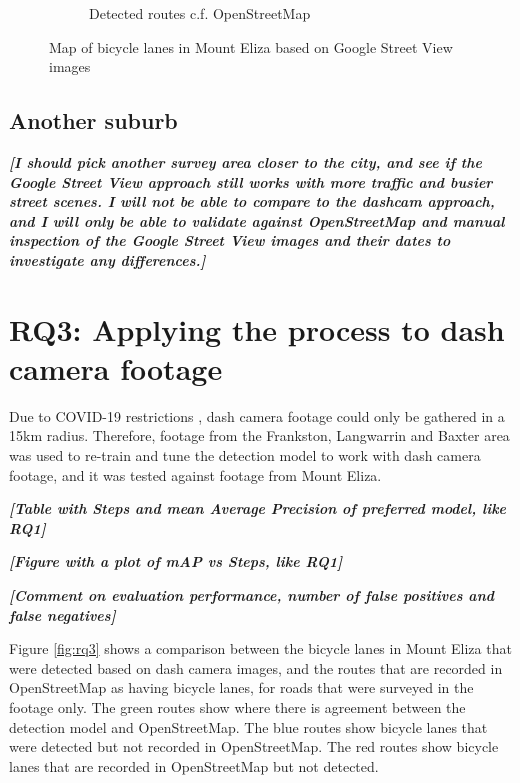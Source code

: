 \documentclass[11pt,twoside]{report}
\newcommand{\remark}[1]{{\bf \em [\marginpar{$\Leftarrow$}#1]}}
\begin{document}
\begin{figure}[h]
\begin{subfigure}{0.45\textwidth}
	\caption{Detected routes c.f. OpenStreetMap}
	\label{fig:rq2b}
\end{subfigure}
\caption{Map of bicycle lanes in Mount Eliza based on Google Street View images}
\label{fig:rq2}
\end{figure}


\subsection{Another suburb}

\remark{I should pick another survey area closer to the city, and see if the Google Street View approach still works with more traffic and busier street scenes.  I will not be able to compare to the dashcam approach, and I will only be able to validate against OpenStreetMap and manual inspection of the Google Street View images and their dates to investigate any differences.}


\clearpage
\section{RQ3: Applying the process to dash camera footage}
\label{results:rq3}

Due to COVID-19 restrictions \cite{lockdown_5km} \cite{lockdown_record}, dash camera footage could only be gathered in a 15km radius.  Therefore, footage from the Frankston, Langwarrin and Baxter area was used to re-train and tune the detection model to work with dash camera footage, and it was tested against footage from Mount Eliza.

\remark{Table with Steps and mean Average Precision of preferred model, like RQ1}

\remark{Figure with a plot of mAP vs Steps, like RQ1}

\remark{Comment on evaluation performance, number of false positives and false negatives}

Figure \ref{fig:rq3} shows a comparison between the bicycle lanes in Mount Eliza that were detected based on dash camera images, and the routes that are recorded in OpenStreetMap as having bicycle lanes, for roads that were surveyed in the footage only.  The green routes show where there is agreement between the detection model and OpenStreetMap.  The blue routes show bicycle lanes that were detected but not recorded in OpenStreetMap.  The red routes show bicycle lanes that are recorded in OpenStreetMap but not detected.
\end{document}

